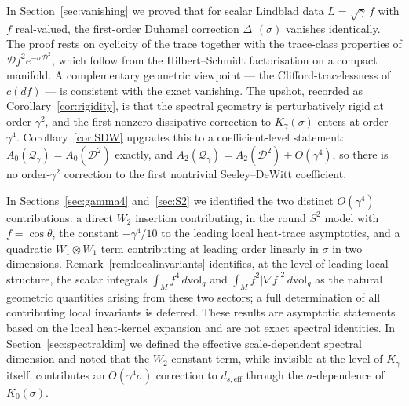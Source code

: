 \documentclass[11pt,a4paper]{article}
\numberwithin{equation}{section}
\theoremstyle{definition}
\newcommand{\cD}{\mathcal{D}}
\newcommand{\Qg}{\mathcal{Q}_\gamma}
\begin{document}
In Section~\ref{sec:vanishing} we proved that for scalar Lindblad data
$L = \sqrt{\gamma}\,f$ with $f$ real-valued, the first-order Duhamel
correction $\Delta_1(\sigma)$ vanishes identically. The proof rests on
cyclicity of the trace together with the trace-class properties of
$\cD f^2 e^{-\sigma\cD^2}$, which follow from the Hilbert--Schmidt
factorisation on a compact manifold. A complementary geometric viewpoint
--- the Clifford-tracelessness of $c(df)$ --- is consistent with the
exact vanishing. The upshot, recorded as Corollary~\ref{cor:rigidity}, is
that the spectral geometry is perturbatively rigid at order $\gamma^2$,
and the first nonzero dissipative correction to $K_\gamma(\sigma)$ enters
at order $\gamma^4$. Corollary~\ref{cor:SDW} upgrades this to a
coefficient-level statement: $A_0(\Qg)=A_0(\cD^2)$
exactly, and $A_2(\Qg)=A_2(\cD^2)+O(\gamma^4)$,
so there is no order-$\gamma^2$ correction to the first nontrivial
Seeley--DeWitt coefficient.

In Sections~\ref{sec:gamma4} and~\ref{sec:S2} we identified the two
distinct $O(\gamma^4)$ contributions: a direct $W_2$ insertion
contributing, in the round $S^2$ model with $f=\cos\theta$, the constant
$-\gamma^4/10$ to the leading local heat-trace
asymptotics, and a quadratic $W_1\otimes W_1$ term contributing at
leading order linearly in $\sigma$ in two dimensions.
Remark~\ref{rem:localinvariants} identifies, at the level of leading
local structure, the scalar integrals $\int_M f^4\,d\mathrm{vol}_g$
and $\int_M f^2|\nabla f|^2\,d\mathrm{vol}_g$ as the natural geometric
quantities arising from these two sectors; a full determination of all
contributing local invariants is deferred. These results are asymptotic
statements based on the local heat-kernel expansion and are not exact
spectral identities. In Section~\ref{sec:spectraldim} we
defined the effective scale-dependent spectral dimension and noted that
the $W_2$ constant term, while invisible at the level of $K_\gamma$
itself, contributes an $O(\gamma^4\sigma)$ correction to
$d_{s,\mathrm{eff}}$ through the $\sigma$-dependence of $K_0(\sigma)$.
\end{document}
